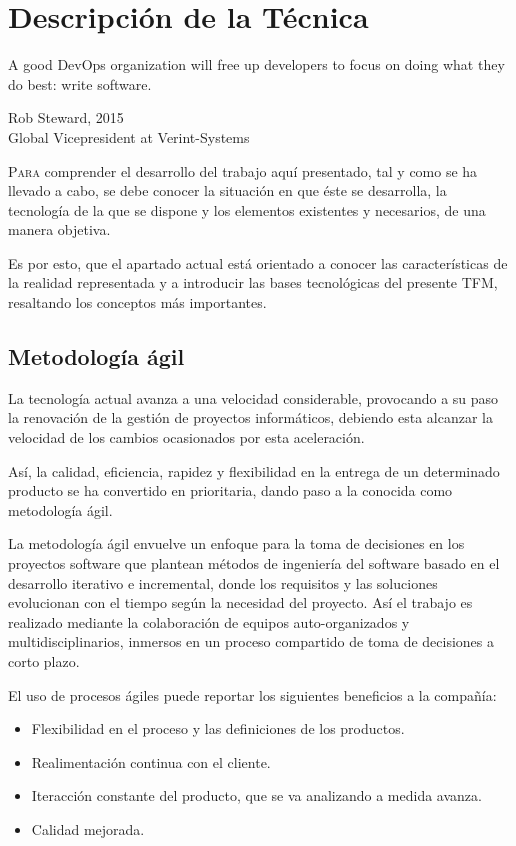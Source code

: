 \chapter{Descripción de la Técnica}\label{chp-02}
\epigraph{A good DevOps organization will free up developers to focus on doing what they do best: write software. }{Rob Steward, 2015\\Global Vicepresident at Verint-Systems}

\lettrine[lraise=-0.1, lines=2, loversize=0.2]{P}{ara} comprender el desarrollo del trabajo aquí presentado, tal y como se ha llevado a cabo, se debe conocer la situación en que éste se desarrolla, la tecnología de la que se dispone y los elementos existentes y necesarios, de una manera objetiva.

Es por esto, que el apartado actual está orientado a conocer las características de la realidad representada y a introducir las bases tecnológicas del presente \gls{TFM}, resaltando los conceptos más importantes.

\section{Metodología ágil}

La tecnología actual avanza a una velocidad considerable, provocando a su paso la renovación de la gestión de proyectos informáticos, debiendo esta alcanzar la velocidad de los cambios ocasionados por esta aceleración. 

Así, la calidad, eficiencia, rapidez y flexibilidad en la entrega de un determinado producto se ha convertido en prioritaria, dando paso a la conocida como metodología ágil.

La metodología ágil envuelve un enfoque para la toma de decisiones en los proyectos software que plantean métodos de ingeniería del software basado en el desarrollo iterativo e incremental, donde los requisitos y las soluciones evolucionan con el tiempo según la necesidad del proyecto. Así el trabajo es realizado mediante la colaboración de equipos auto-organizados y multidisciplinarios, inmersos en un proceso compartido de toma de decisiones a corto plazo\cite{vera2014}.

El uso de procesos ágiles puede reportar los siguientes beneficios a la compañía:

\begin{itemize}
	\item Flexibilidad en el proceso y las definiciones de los productos.
	\item Realimentación continua con el cliente.
	\item Iteracción constante del producto, que se va analizando a medida avanza.
	\item Calidad mejorada.
\end{itemize}


